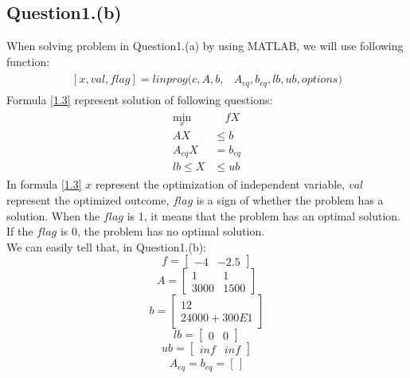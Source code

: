 \documentclass[titlepage,a4paper]{article}
\begin{document}
        \subsection{Question1.(b)}
            When solving problem in Question1.(a) by using MATLAB, we will use following function:
            \begin{align}\label{1.3}
            \begin{split}  
                [x,val,flag] = linprog(c,A,b,&A_{eq},b_{eq},lb,ub,options)
            \end{split}    
            \end{align}    
            Formula \eqref{1.3} represent solution of following questions:
            \begin{align}\label{1.4}
            \begin{split}  
                \min_x &\quad fX\\
                AX &\leq b\\
                A_{eq}X &= b_{eq}\\
                lb\leq X &\leq ub
            \end{split}    
            \end{align} 
            In formula \eqref{1.3} $x$ represent the optimization of independent variable, $val$ represent the optimized outcome, $flag$ is a sign of whether the problem has a solution. When the $flag$ is 1, it means that the problem has an optimal solution. If the $flag$ is 0, the problem has no optimal solution.\\
            We can easily tell that, in Question1.(b):
            \[ f = \begin{bmatrix}\label{1.5}
            -4&-2.5
            \end{bmatrix}\]
            \[ A = \begin{bmatrix}\label{1.6}
            1&1\\
            3000&1500
            \end{bmatrix}\]
            \[ b = \begin{bmatrix}\label{1.7}
            12\\
            24000+300E1
            \end{bmatrix}\]
            \[ lb = \begin{bmatrix}\label{1.8}
            0&0
            \end{bmatrix}\]
            \[ ub = \begin{bmatrix}\label{1.9}
            inf&inf
            \end{bmatrix}\]
            \begin{align}\label{1.10}
                A_{eq} = b_{eq} = [\,]
            \end{align} 
            
\end{document}
